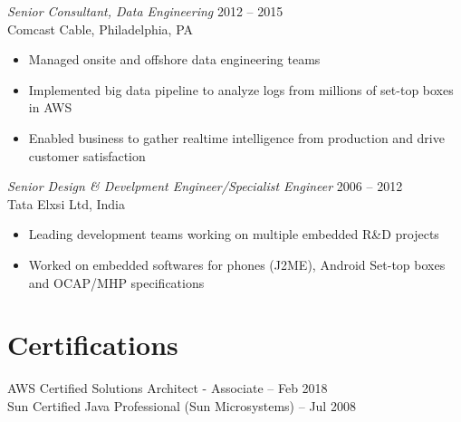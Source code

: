 \documentclass[margin]{res}
\begin{document}
\begin{resume}
    {\sl Senior Consultant, Data Engineering} \hfill            2012 -- 2015 \\
    Comcast Cable, Philadelphia, PA
    \begin{itemize}  \itemsep -2pt %
        \item Managed onsite and offshore data engineering teams
        \item Implemented big data pipeline to analyze logs from millions of set-top boxes in AWS
        \item Enabled business to gather realtime intelligence from production and drive customer satisfaction
    \end{itemize}
    {\sl Senior Design \& Develpment Engineer/Specialist Engineer} \hfill        2006 -- 2012 \\
    Tata Elxsi Ltd, India
    \begin{itemize}
        \item Leading development teams working on multiple embedded R\&D projects
        \item Worked on embedded softwares for phones (J2ME), Android Set-top boxes and OCAP/MHP specifications
    \end{itemize}

    \section{Certifications}
    AWS Certified Solutions Architect - Associate -- Feb 2018\\
    Sun Certified Java Professional (Sun Microsystems) -- Jul 2008


\end{resume}
\end{document}
